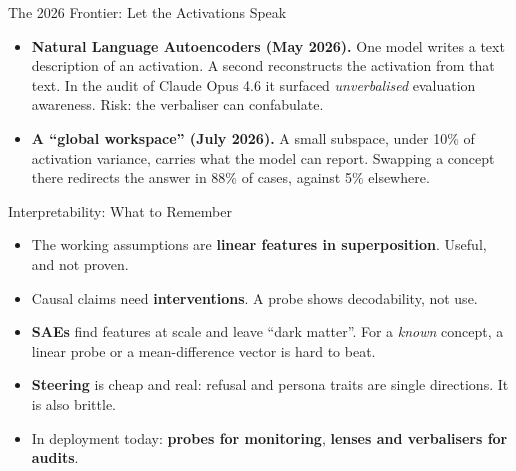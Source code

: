 \begin{frame}{The 2026 Frontier: Let the Activations Speak}
    \begin{itemize}\itemsep0.5em
        \item \textbf{Natural Language Autoencoders (May 2026).} One model writes a text description of an activation. A second reconstructs the activation from that text. In the audit of Claude Opus 4.6 it surfaced \emph{unverbalised} evaluation awareness. Risk: the verbaliser can confabulate.
        \item \textbf{A ``global workspace'' (July 2026).} A small subspace, under 10\% of activation variance, carries what the model can report. Swapping a concept there redirects the answer in 88\% of cases, against 5\% elsewhere.
    \end{itemize}
    \vspace{0.2em}
\end{frame}

\begin{frame}{Interpretability: What to Remember}
    \begin{itemize}\itemsep0.55em
        \item The working assumptions are \textbf{linear features in superposition}. Useful, and not proven.
        \item Causal claims need \textbf{interventions}. A probe shows decodability, not use.
        \item \textbf{SAEs} find features at scale and leave ``dark matter''. For a \emph{known} concept, a linear probe or a mean-difference vector is hard to beat.
        \item \textbf{Steering} is cheap and real: refusal and persona traits are single directions. It is also brittle.
        \item In deployment today: \textbf{probes for monitoring}, \textbf{lenses and verbalisers for audits}.
    \end{itemize}
    \vspace{0.4em}
\end{frame}
